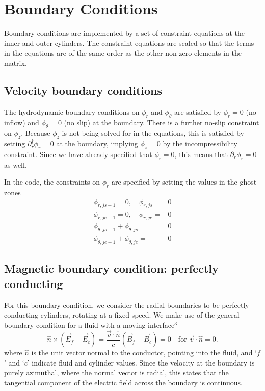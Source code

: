 \documentclass[letterpaper]{article}
\begin{document}
\section{Boundary Conditions}

Boundary conditions are implemented by a set of constraint equations
at the inner and outer cylinders. The constraint equations are scaled
so that the terms in the equations are of the same order as the other
non-zero elements in the matrix.

\subsection{Velocity boundary conditions}

The hydrodynamic boundary conditions on $\phi_r$ and $\phi_\theta$ are
satisfied by $\phi_r = 0$ (no inflow) and $\phi_\theta = 0$ (no slip)
at the boundary.  There is a further no-slip constraint on $\phi_z$.
Because $\phi_z$ is not being solved for in the equations, this is
satisfied by setting $\partial_r^\dagger \phi_r = 0$ at the boundary,
implying $\phi_z=0$ by the incompressibility constraint. Since we have
already specified that $\phi_r=0$, this means that $\partial_r
\phi_r=0$ as well.

In the code, the constraints on $\phi_r$ are specified by setting the
values in the ghost zones
\begin{align}
\phi_{r,js-1} = 0, \quad \phi_{r, js} =& 0
\\
\phi_{r,je+1} = 0, \quad \phi_{r,je} = & 0
\\
\phi_{\theta,js-1} + \phi_{\theta,js}= &0 
\\
\phi_{\theta,je+1} + \phi_{\theta,je}= &0
\end{align}

\subsection{Magnetic boundary condition: perfectly conducting}

For this boundary condition, we consider the radial boundaries to be
perfectly conducting cylinders, rotating at a fixed speed. We make use
of the general boundary condition for a fluid with a moving interface$^3$
\begin{equation}
\hat{n}\times\left(\vec{E}_f - \vec{E}_c\right) = 
 \frac{\vec{v}\cdot\hat{n}}{c}\left(\vec{B}_f - \vec{B}_c\right) = 0
 \quad \text{for $\vec{v}\cdot\hat{n} = 0$.}
\end{equation}
where $\hat{n}$ is the unit vector normal to the conductor, pointing
into the fluid, and `$f$' and `$c$' indicate fluid and cylinder
values. Since the velocity at the boundary is purely azimuthal, where
the normal vector is radial, this states that the tangential component
of the electric field across the boundary is continuous.
\end{document}
